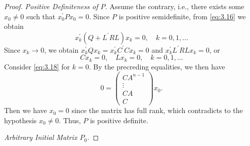 \begin{proof}
\textit{Positive Definiteness of $P$.} 
Assume the contrary, i.e., there exists some $x_0\neq 0$ such that $x_0^{\prime} P x_0=0$. Since $P$ is positive semidefinite, from \cref{eq:3.16} we obtain \[x_k^\prime (Q + L^\prime R L)x_k = 0,\quad k = 0,1,\dots\]
Since $x_k\rightarrow 0$, we obtain $x_k^\prime Q x_k=x_k^\prime C^\prime C x_k=0$ and $x_k^\prime L^\prime R L x_k=0$, or
\[Cx_k = 0,\quad L x_k = 0,\quad k = 0,1,\dots\]
Consider \cref{eq:3.18} for $k=0$. By the precreding equalities, we then have 
\[0 = \begin{pmatrix}
    CA^{n - 1}\\ 
    \vdots\\ CA \\ C 
\end{pmatrix}x_0.\]
Then we have $x_0=0$ since the matrix has full rank, which contradicts to the hypothesis $x_0\neq 0$. Thus, $P$ is positive definite.

\textit{Arbitrary Initial Matrix $P_0$.} 


\end{proof}
